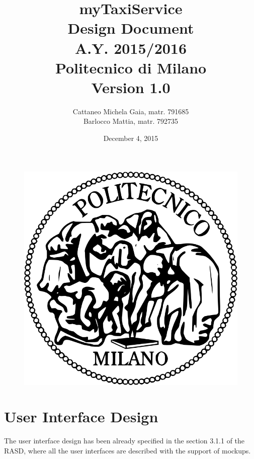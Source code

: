 \documentclass[18pt,oneside,a4paper, titlepage]{article}
\begin{document}
\begin{figure}[t]
	\centering
	\includegraphics[scale=0.35]{logo-polimi.png}
\end{figure}
\title{\textbf{myTaxiService}\\\textbf{D}esign \textbf{D}ocument\\ A.Y. 2015/2016\\
	Politecnico di Milano \\ Version 1.0}	
\author{Cattaneo Michela Gaia, matr. 791685\\Barlocco Mattia, matr. 792735 }
\date{December 4, 2015}
\maketitle

\newpage
	\tableofcontents
\newpage
	
		
	
\newpage	
	\section{User Interface Design}
		The user interface design has been already specified in the section 3.1.1 of the RASD, where all the user interfaces are described with the support of mockups.
\newpage
\end{document}
